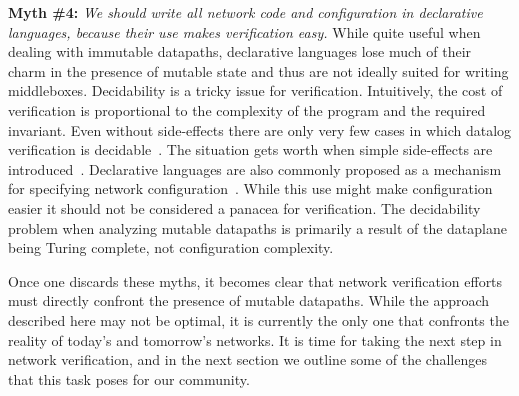 {\noindent \bf Myth \#4:} \emph{We should write all network code and configuration in declarative languages, because their use makes verification easy.} While quite useful when dealing with immutable datapaths, declarative languages lose much of their charm in the presence of mutable state and thus are not ideally suited
for writing middleboxes.
Decidability is a tricky issue for verification.
Intuitively, the cost of verification is proportional to the complexity of the program and the required invariant.
Even without side-effects there are only very few cases in which datalog verification is decidable~\cite{Halevy}.
The situation gets worth when simple side-effects are introduced~\cite{janos}.
Declarative languages are also commonly proposed as a mechanism for specifying network configuration~\cite{congress}. While this use might make configuration easier
it should not be considered a panacea for verification. The decidability problem when analyzing mutable datapaths is primarily a result of the dataplane being
Turing complete, not configuration complexity.

\medskip

Once one discards these myths, it becomes clear that network verification efforts must directly confront the presence of mutable datapaths. While the approach described here may not be optimal, it is currently the only one that confronts the reality of today's and tomorrow's networks. It is time for taking the next step in network verification, and in the next section we outline some of the challenges that this task poses for our community.


